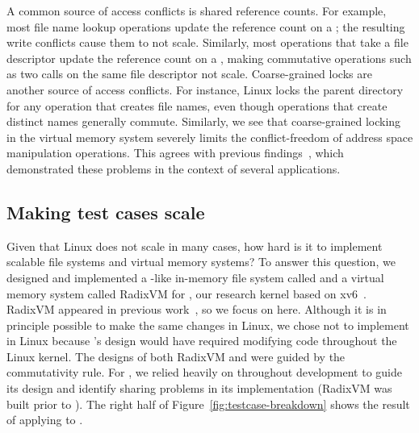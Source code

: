 A common source of access conflicts is shared reference counts.
%
For example, most file name lookup operations update the reference
count on a ; the resulting write conflicts cause
them to not scale.
%
Similarly, most operations that take a file descriptor update the
reference count on a , making
commutative operations such as two  calls on the
same file descriptor not scale.
Coarse-grained locks are another source of access conflicts.  For
instance, Linux locks the parent directory for any operation that
creates file names, even though operations that create distinct names
generally commute.
%
%
Similarly, we see that coarse-grained locking in the virtual memory
system severely limits the conflict-freedom of address space manipulation
operations. This agrees with previous
findings~\cite{boyd-wickizer:scaling,clements:radixvm,clements:bonsai},
which demonstrated these problems in the context of several applications.



\subsection{Making test cases scale}

\cbstart Given that Linux does not scale in many cases, how hard is it
to implement scalable file systems and virtual memory systems?  To answer this
question, we designed and implemented a -like in-memory
file system called \fs and a virtual memory system called RadixVM for
\sys, our research kernel based on xv6~\cite{xv6}.  RadixVM appeared
in previous work~\cite{clements:radixvm}, so we focus on \fs here.
%
Although it is in principle possible to make the same changes in Linux,
we chose not to implement \fs in Linux because \fs's design
would have required modifying code throughout the Linux kernel.
%
The designs of both RadixVM and \fs were guided by the
commutativity rule.  For \fs, we relied heavily on \tool throughout
development to guide its design and identify sharing problems in its
implementation (RadixVM
was built prior to
\tool).
%
The right half of Figure~\ref{fig:testcase-breakdown} shows the
result of applying \tool
to \sys. \cbend
{}

